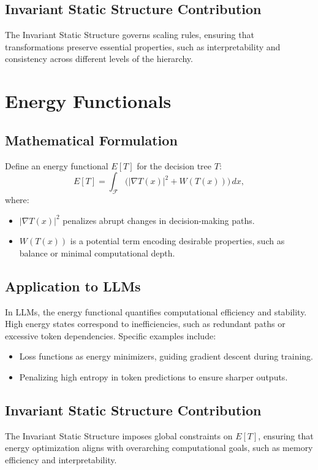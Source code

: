 \subsection{Invariant Static Structure Contribution}
The Invariant Static Structure governs scaling rules, ensuring that transformations preserve essential properties, such as interpretability and consistency across different levels of the hierarchy.

\section{Energy Functionals}

\subsection{Mathematical Formulation}
Define an energy functional $E[T]$ for the decision tree $T$:
\begin{equation}
E[T] = \int_\mathcal{F} \Big( |\nabla T(x)|^2 + W(T(x)) \Big) \, dx,
\end{equation}
where:
\begin{itemize}
    \item $|\nabla T(x)|^2$ penalizes abrupt changes in decision-making paths.
    \item $W(T(x))$ is a potential term encoding desirable properties, such as balance or minimal computational depth.
\end{itemize}

\subsection{Application to LLMs}
In LLMs, the energy functional quantifies computational efficiency and stability. High energy states correspond to inefficiencies, such as redundant paths or excessive token dependencies. Specific examples include:
\begin{itemize}
    \item Loss functions as energy minimizers, guiding gradient descent during training.
    \item Penalizing high entropy in token predictions to ensure sharper outputs.
\end{itemize}

\subsection{Invariant Static Structure Contribution}
The Invariant Static Structure imposes global constraints on $E[T]$, ensuring that energy optimization aligns with overarching computational goals, such as memory efficiency and interpretability.


